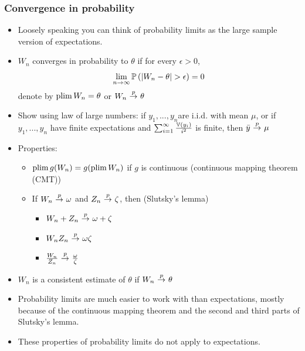 \begin{frame}[allowframebreaks]
  \frametitle{Convergence in probability}
  \begin{itemize}
  \item Loosely speaking you can think of probability limits as the large
sample version of expectations. 
\item $W_n$ \alert{converges in probability} to $\theta$ if for every
    $\epsilon > 0$, 
    \[ \lim_{n {\rightarrow} \infty} {\mathbb{P}}\left( \left\vert {W_n - \theta} \right\vert > \epsilon
    \right) = 0 \]
    denote by $\plim W_n = \theta$ or $W_n \inprob \theta$
  \item Show using \alert{law of large numbers}: if $y_1, ..., y_n$are
    i.i.d. with mean $\mu$, or if $y_1, ..., y_n$ have finite
    expectations and $\sum_{i=1}^\infty \frac{\mathbb{V}(y_i)}{i^2}$ is
    finite, then $ \bar{y} \inprob \mu$
  \item Properties:
    \begin{itemize}
    \item $\plim g(W_n) = g(\plim W_n)$ if $g$ is continuous
      (\alert{continuous mapping theorem (CMT)})
    \item If $W_n \inprob \omega$ and $Z_n \inprob \zeta$, then
      (\alert{Slutsky's lemma})
      \begin{itemize} 
      \item $W_n + Z_n \inprob \omega + \zeta$
      \item $W_n Z_n \inprob \omega \zeta$
      \item $\frac{W_n}{Z_n} \inprob \frac{\omega}{\zeta}$
      \end{itemize}
    \end{itemize}
  \item $W_n$ is a \alert{consistent} estimate of $\theta$ if $W_n
    \inprob \theta$
\item Probability limits are much easier to work with than expectations,
mostly because of the continuous mapping theorem and the second and
third parts of Slutsky's lemma. 
\item These properties of probability limits
do not apply to expectations.
  \end{itemize}
\end{frame}


